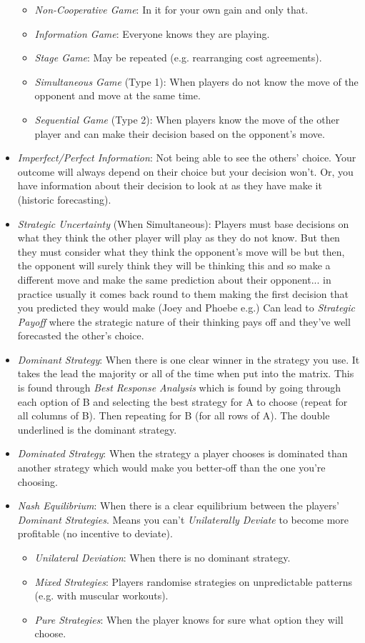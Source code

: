 \documentclass[11pt, english]{article}
\begin{document}
\begin{itemize}
\begin{itemize}
			\item \textit{Non-Cooperative Game}: In it for your own gain and only that.
			\item \textit{Information Game}: Everyone knows they are playing.
			\item \textit{Stage Game}: May be repeated (e.g. rearranging cost agreements).
			\item \textit{Simultaneous Game} (Type 1): When players do not know the move of the opponent and move at the same time.
			\item \textit{Sequential Game} (Type 2): When players know the move of the other player and can make their decision based on the opponent’s move. 
		\end{itemize}
		\item \textit{Imperfect/Perfect Information}: Not being able to see the others’ choice. Your outcome will always depend on their choice but your decision won’t. Or, you have information about their decision to look at as they have make it (historic forecasting).
		\item \textit{Strategic Uncertainty} (When Simultaneous): Players must base decisions on what they think the other player will play as they do not know. But then they must consider what they think the opponent’s move will be but then, the opponent will surely think they will be thinking this and so make a different move and make the same prediction about their opponent... in practice usually it comes back round to them making the first decision that you predicted they would make (Joey and Phoebe e.g.) Can lead to \textit{Strategic Payoff} where the strategic nature of their thinking pays off and they’ve well forecasted the other’s choice.
		\item \textit{Dominant Strategy}: When there is one clear winner in the strategy you use. It takes the lead the majority or all of the time when put into the matrix. This is found through \textit{Best Response Analysis} which is found by going through each option of B and selecting the best strategy for A to choose (repeat for all columns of B). Then repeating for B (for all rows of A). The double underlined is the dominant strategy.
		\item \textit{Dominated Strategy}: When the strategy a player chooses is dominated than another strategy which would make you better-off than the one you’re choosing.
		\item \textit{Nash Equilibrium}: When there is a clear equilibrium between the players' \textit{Dominant Strategies}. Means you can't \textit{Unilaterally Deviate} to become more profitable (no incentive to deviate).
		\begin{itemize}
			\item \textit{Unilateral Deviation}: When there is no dominant strategy.
			\item \textit{Mixed Strategies}: Players randomise strategies on unpredictable patterns (e.g. with muscular workouts).
			\item \textit{Pure Strategies}: When the player knows for sure what option they will choose.
		\end{itemize}
	\end{itemize}
\end{document}
